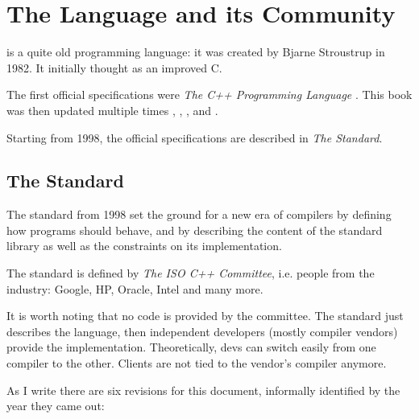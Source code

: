 \chapter{The \Cpp{} Language and its Community}

\Cpp is a quite old programming language: it was created by Bjarne Stroustrup
in 1982. It initially thought as an improved C.

The first official specifications were \emph{The C++ Programming
  Language} \cite{the-cpp-programming-language-1st}. This book was
then updated multiple times \cite{the-cpp-programming-language-2nd},
\cite{the-cpp-programming-language-3rd},
\cite{the-cpp-programming-language-se}, and
\cite{the-cpp-programming-language-4th}.

Starting from 1998, the official specifications are described in
\emph{The Standard}.

\section{The Standard}

The standard from 1998 set the ground for a new era of compilers by
defining how \cpp{} programs should behave, and by describing the
content of the standard library as well as the constraints on its
implementation.

The standard is defined by {\em The ISO C++ Committee}, i.e. people
from the industry: Google, HP, Oracle, Intel and many more.

It is worth noting that no code is provided by the committee. The
standard just describes the language, then independent developers
(mostly compiler vendors) provide the implementation. Theoretically,
devs can switch easily from one compiler to the other. Clients are not
tied to the vendor's compiler anymore.

As I write there are six revisions for this document, informally
identified by the year they came out:

